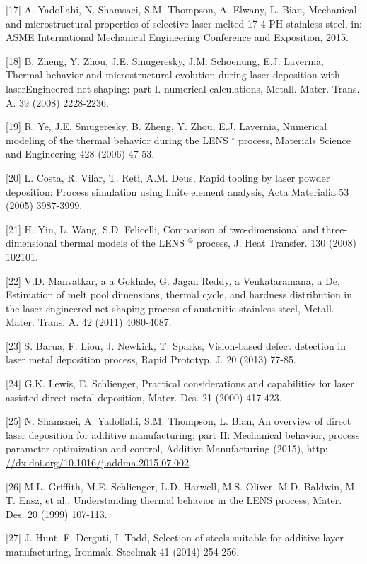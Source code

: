 \documentclass[10pt]{article}
\begin{document}
[17] A. Yadollahi, N. Shamsaei, S.M. Thompson, A. Elwany, L. Bian, Mechanical and microstructural properties of selective laser melted 17-4 PH stainless steel, in: ASME International Mechanical Engineering Conference and Exposition, 2015.

[18] B. Zheng, Y. Zhou, J.E. Smugeresky, J.M. Schoenung, E.J. Lavernia, Thermal behavior and microstructural evolution during laser deposition with laserEngineered net shaping: part I. numerical calculations, Metall. Mater. Trans. A. 39 (2008) 2228-2236.

[19] R. Ye, J.E. Smugeresky, B. Zheng, Y. Zhou, E.J. Lavernia, Numerical modeling of the thermal behavior during the LENS ${ }^{\circ}$ process, Materials Science and Engineering 428 (2006) 47-53.

[20] L. Costa, R. Vilar, T. Reti, A.M. Deus, Rapid tooling by laser powder deposition: Process simulation using finite element analysis, Acta Materialia 53 (2005) 3987-3999.

[21] H. Yin, L. Wang, S.D. Felicelli, Comparison of two-dimensional and three-\\
dimensional thermal models of the LENS ${ }^{\circledR}$ process, J. Heat Transfer. 130 (2008) 102101.

[22] V.D. Manvatkar, a a Gokhale, G. Jagan Reddy, a Venkataramana, a De, Estimation of melt pool dimensions, thermal cycle, and hardness distribution in the laser-engineered net shaping process of austenitic stainless steel, Metall. Mater. Trans. A. 42 (2011) 4080-4087.

[23] S. Barua, F. Liou, J. Newkirk, T. Sparks, Vision-based defect detection in laser metal deposition process, Rapid Prototyp. J. 20 (2013) 77-85.

[24] G.K. Lewis, E. Schlienger, Practical considerations and capabilities for laser assisted direct metal deposition, Mater. Des. 21 (2000) 417-423.

[25] N. Shamsaei, A. Yadollahi, S.M. Thompson, L. Bian, An overview of direct laser deposition for additive manufacturing; part II: Mechanical behavior, process parameter optimization and control, Additive Manufacturing (2015), http: \href{//dx.doi.org/10.1016/j.addma.2015.07.002}{//dx.doi.org/10.1016/j.addma.2015.07.002}.

[26] M.L. Griffith, M.E. Schlienger, L.D. Harwell, M.S. Oliver, M.D. Baldwin, M. T. Ensz, et al., Understanding thermal behavior in the LENS process, Mater. Des. 20 (1999) 107-113.

[27] J. Hunt, F. Derguti, I. Todd, Selection of steels suitable for additive layer manufacturing, Ironmak. Steelmak 41 (2014) 254-256.
\end{document}
